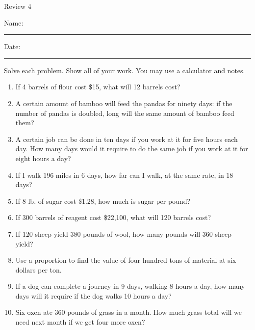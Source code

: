 \documentclass[12pt]{article}
\begin{document}
\pagestyle{empty} %
\begin{center}
          Review 4\\[0.5in]
\end{center}
Name: \rule{4in}{0.005in} Date: \rule{1.5in}{0.005in} 
  \vspace{0.25in}

Solve each problem. Show all of your work. You may use a calculator and notes. 

\begin{enumerate}
\newcommand{\spacing}{\vspace{0.75in}}

\item If 4 barrels of flour cost \$15, what will 12 barrels cost? 
\spacing

\item A certain amount of bamboo will feed the pandas for ninety days: if the number of pandas is doubled, long will the same amount of bamboo feed them? 
\spacing

\item A certain job can be done in ten days if you work at it for five hours each day. How many days would it require to do the same job if you work at it for eight hours a day? 
\spacing
 
\item If I walk 196 miles in 6 days, how far can I walk, at the same rate, in 18 days? 
\spacing

\item If 8 lb. of sugar cost \$1.28, how much is sugar per pound? 
\spacing

\item If 300 barrels of reagent cost \$22,100, what will 120 barrels cost? 
\spacing

\item If 120 sheep yield 380 pounds of wool, how many pounds will 360 sheep yield? 
\spacing

\item Use a proportion to find the value of four hundred tons of material at six dollars per ton.  
\spacing

\item If a dog can complete a journey in 9 days, walking 8 hours a day, how many days will it require if the dog walks 10 hours a day? 
\spacing

\item Six oxen ate 360 pounds of grass in a month. How much grass total will we need next month if we get four more oxen? 
\spacing


\end{enumerate}
\end{document}
